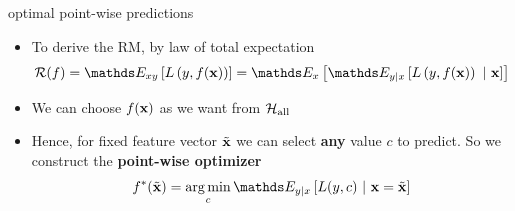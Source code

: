 \documentclass[11pt,compress,t,notes=noshow, xcolor=table]{beamer}
\begin{document}


% 
% 



\begin{frame}[t]{optimal point-wise predictions}  

\begin{itemize}

\item To derive the RM, by law of total expectation 
$$    \riskf = \E_{xy} \left[\Lxy\right] 
= \E_x \left[\E_{y|x}\left[\Lxy~|~\xv\right]\right]$$

\item We can choose $f(\mathbf{x})$ as we want from $\mathcal{H}_{\text{all}}$ 
\item Hence, for fixed feature vector $\tilde{\mathbf{x}}$ we can select \textbf{any} value $c$ to predict. So we construct the \textbf{point-wise optimizer} 
$$\fbayes(\xtil) = \argmin_c \E_{y|x}\left[L(y, c)~|~ \xv = \xtil \right] $$
\end{itemize}


\end{frame}
\end{document}
